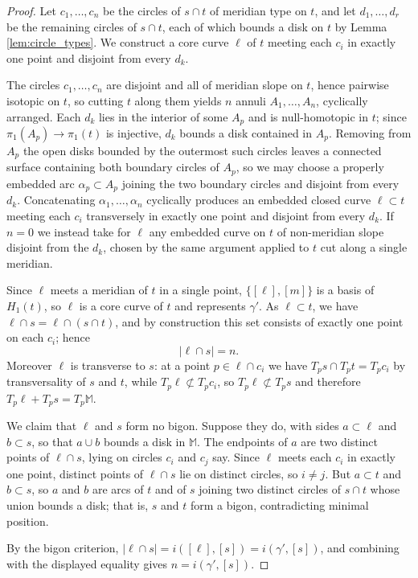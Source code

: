 \documentclass[12pt,a4paper]{amsart}
\numberwithin{equation}{section}
\newcommand{\MM}{\mathbb{M}}
\theoremstyle{plain}
\theoremstyle{definition}
\theoremstyle{remark}
\begin{document}
\begin{proof}
    Let $c_1, \dots, c_n$ be the circles of $s \cap t$ of meridian type on $t$, and let $d_1, \dots, d_r$ be the remaining circles of $s \cap t$, each of which bounds a disk on $t$ by Lemma \ref{lem:circle_types}.
    We construct a core curve $\ell$ of $t$ meeting each $c_i$ in exactly one point and disjoint from every $d_k$.

    The circles $c_1, \dots, c_n$ are disjoint and all of meridian slope on $t$, hence pairwise isotopic on $t$, so cutting $t$ along them yields $n$ annuli $A_1, \dots, A_n$, cyclically arranged.
    Each $d_k$ lies in the interior of some $A_p$ and is null-homotopic in $t$; since $\pi_1(A_p) \to \pi_1(t)$ is injective, $d_k$ bounds a disk contained in $A_p$.
    Removing from $A_p$ the open disks bounded by the outermost such circles leaves a connected surface containing both boundary circles of $A_p$, so we may choose a properly embedded arc $\alpha_p \subset A_p$ joining the two boundary circles and disjoint from every $d_k$.
    Concatenating $\alpha_1, \dots, \alpha_n$ cyclically produces an embedded closed curve $\ell \subset t$ meeting each $c_i$ transversely in exactly one point and disjoint from every $d_k$.
    If $n = 0$ we instead take for $\ell$ any embedded curve on $t$ of non-meridian slope disjoint from the $d_k$, chosen by the same argument applied to $t$ cut along a single meridian.

    Since $\ell$ meets a meridian of $t$ in a single point, $\{[\ell], [m]\}$ is a basis of $H_1(t)$, so $\ell$ is a core curve of $t$ and represents $\gamma'$.
    As $\ell \subset t$, we have $\ell \cap s = \ell \cap (s \cap t)$, and by construction this set consists of exactly one point on each $c_i$; hence
    \[
        \lvert \ell \cap s \rvert = n .
    \]
    Moreover $\ell$ is transverse to $s$: at a point $p \in \ell \cap c_i$ we have $T_p s \cap T_p t = T_p c_i$ by transversality of $s$ and $t$, while $T_p \ell \not\subset T_p c_i$, so $T_p \ell \not\subset T_p s$ and therefore $T_p \ell + T_p s = T_p \MM$.

    We claim that $\ell$ and $s$ form no bigon.
    Suppose they do, with sides $a \subset \ell$ and $b \subset s$, so that $a \cup b$ bounds a disk in $\MM$.
    The endpoints of $a$ are two distinct points of $\ell \cap s$, lying on circles $c_i$ and $c_j$ say.
    Since $\ell$ meets each $c_i$ in exactly one point, distinct points of $\ell \cap s$ lie on distinct circles, so $i \neq j$.
    But $a \subset t$ and $b \subset s$, so $a$ and $b$ are arcs of $t$ and of $s$ joining two distinct circles of $s \cap t$ whose union bounds a disk; that is, $s$ and $t$ form a bigon, contradicting minimal position.

    By the bigon criterion, $\lvert \ell \cap s \rvert = i([\ell], [s]) = i(\gamma', [s])$, and combining with the displayed equality gives $n = i(\gamma', [s])$.
\end{proof}
\end{document}
